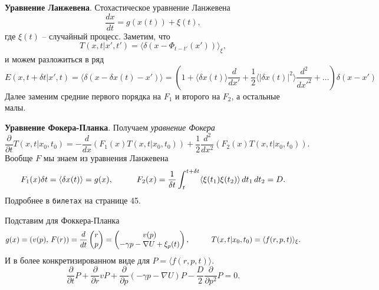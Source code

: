\textbf{Уравнение Ланжевена}. Стохастическое уравнение Ланжевена
\begin{equation*}
	\frac{d x}{d t}  = g(x(t)) + \xi(t),
\end{equation*}
где $\xi(t)$ -- случайный процесс. Заметим, что
\begin{equation*}
	T(x, t|x',t') = \langle \delta(x-\Phi_{t-t'}(x'))\rangle_\xi,
\end{equation*}
и можем разложиться в ряд
\begin{equation*}
	E(x, t+ \delta t| x' , t) = \langle \delta(x-\delta x(t)-x')\rangle 
	= \left(
		1 + \langle \delta x(t)\rangle \frac{d }{d x'} + \frac{1}{2} \langle |\delta x(t)|^2\rangle \frac{d^2}{d {x'}^2}  + \ldots
	\right) \delta(x-x')
\end{equation*}
Далее заменим средние первого порядка на $F_1$ и второго на $F_2$, а остальные малы.

\textbf{Уравнение Фокера-Планка}. Получаем \textit{уравнение Фокера}
\begin{equation*}
	\frac{\partial }{\partial t} T(x, t|x_0, t_0) = - \frac{d }{d x} \left(
		F_1(x) T(x, t|x_0, t_0)
	\right) + \frac{1}{2} \frac{d^2}{d x^2} \left(
		F_2(x) T(x, t|x_0, t_0)
	\right).
\end{equation*}
Вообще $F$ мы знаем из уравнения Ланжевена
\begin{equation*}
	F_1(x) \delta t = \langle \delta x(t)\rangle = g(x),
	\hspace{10 mm} 
	F_2(x) = \frac{1}{\delta t} \int_{t}^{t+\delta t} \langle \xi(t_1) \xi(t_2)\rangle \d t_1 \d t_2 = D.
\end{equation*}
Подробнее в \texttt{билетах} на странице 45.


Подставим для Фоккера-Планка
\begin{equation*}
	g(x) = (v(p),\, F(r)) = 
	\frac{d }{d t} \begin{pmatrix}
		r \\ p
	\end{pmatrix} = \begin{pmatrix}
		v(p) \\ - \gamma p - \nabla U + \xi_p(t)
	\end{pmatrix},
	\hspace{10 mm} 
	T(x, t|x_0,t_0) = \langle f(r,p, t)\rangle_\xi.
\end{equation*}
И в более конкретизированном виде для $P = \langle f(r, p, t)\rangle$.
\begin{equation}
	\frac{\partial }{\partial t}P + \frac{\partial }{\partial r} vP+ \frac{\partial}{\partial p}  (-\gamma p - \nabla U) P - \frac{D}{2} \frac{\partial }{\partial p^2} P = 0.
\end{equation}



